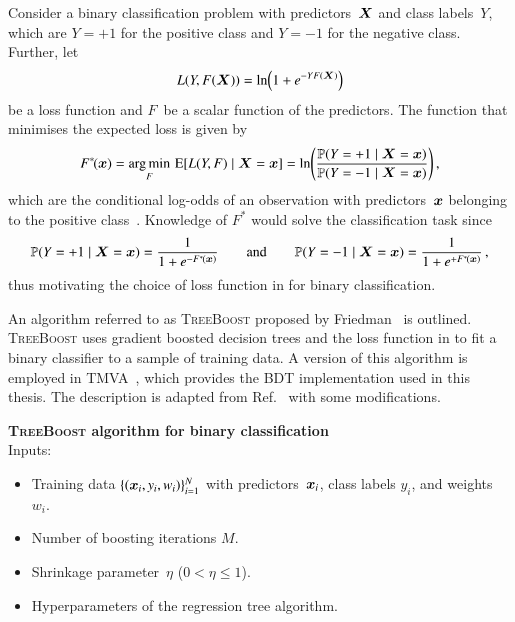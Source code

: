 Consider a binary classification problem with predictors~$\bm{X}$ and class
labels~$Y$, which are $Y = +1$ for the positive class and $Y = -1$ for the
negative class.
Further, let
\begin{align}
  L(Y, F(\bm{X})) = \ln\mathopen{}\left(
  1 + e^{-Y F(\bm{X})}
  \right)\mathclose{}
  \label{eq:loss_gradboost}
\end{align}
be a loss function and $F$~be a scalar function of the predictors. The function
that minimises the expected loss is given by
\begin{align*}
  F^{*\!}(\bm{x})
  = \operatorname*{arg\,min}_F \, \operatorname{E}[ L(Y, F) \mid \bm{X} = \bm{x} ]
  = \ln\mathopen{}\left(
  \frac{
  \mathbb{P}(Y = +1 \mid \bm{X} = \bm{x})
  }{
  \mathbb{P}(Y = -1 \mid \bm{X} = \bm{x})
  }
  \right)\mathclose{} \,\text{,}
\end{align*}
which are the conditional log-odds of an observation with predictors~$\bm{x}$
belonging to the positive class~\cite{Friedman:2000}. Knowledge of $F^{*\!}$
would solve the classification task since
\begin{align}
  \mathbb{P}(Y = +1 \mid \bm{X} = \bm{x}) = \frac{1}{1 + e^{-F^{*\!}(\bm{x})}}
  \qquad \text{and} \qquad
  \mathbb{P}(Y = -1 \mid \bm{X} = \bm{x}) = \frac{1}{1 + e^{+F^{*\!}(\bm{x})}} \,\text{,}
  \label{eq:gradboost_probas}
\end{align}
thus motivating the choice of loss function in  for
binary classification.

An algorithm referred to as \textsc{TreeBoost} proposed by
Friedman~\cite{Friedman:2001wbq} is outlined. \textsc{TreeBoost} uses gradient
boosted decision trees and the loss function in  to fit
a binary classifier to a sample of training data. A version of this algorithm is
employed in \textsc{TMVA}~\cite{TMVA}, which provides the BDT implementation
used in this thesis. The description is adapted from
Ref.~\cite{Friedman:2001wbq} with some modifications.

\vspace{11pt}
\noindent\textbf{\textsc{TreeBoost} algorithm for binary classification}
\nopagebreak\\[11pt]\nopagebreak
\noindent Inputs:
\begin{itemize}[itemsep=2pt]
\item Training data $\{(\bm{x}_i, y_i, w_i)\}_{i = 1}^{N}$ with
  predictors~$\bm{x}_i$, class labels $y_i$, and weights~$w_i$.
\item Number of boosting iterations $M$.
\item Shrinkage parameter~$\eta$ ($0 < \eta \leq 1$).
\item Hyperparameters of the regression tree algorithm.
\end{itemize}

